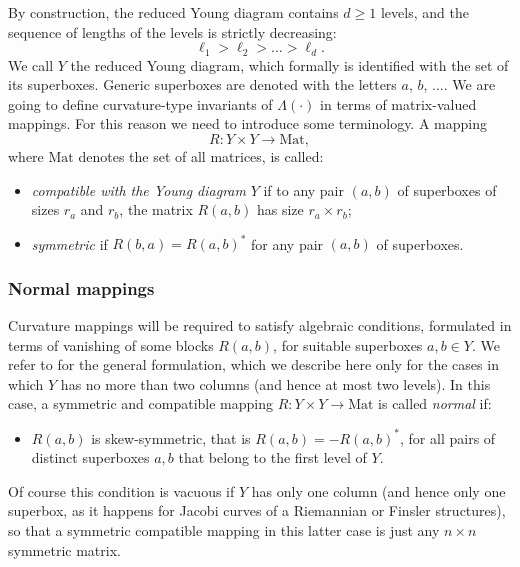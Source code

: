 \documentclass[11pt,a4paper]{article}
\theoremstyle{plain}
\theoremstyle{definition}
\theoremstyle{remark}
\numberwithin{equation}{section}
\begin{document}
By construction, the reduced Young diagram contains $d\geq 1$ levels, and the sequence of lengths of the levels is strictly decreasing:
\begin{equation}
\ell_1 > \ell_2 > \dots > \ell_d.
\end{equation}
We call $Y$ the reduced Young diagram, which formally is identified with the set of its superboxes. Generic superboxes are denoted with the letters $a$, $b$, $\dots$. We are going to define curvature-type invariants of $\Lambda(\cdot)$ in terms of matrix-valued mappings. For this reason we need to introduce some terminology. A mapping
\begin{equation}
R: Y \times Y \to \mathrm{Mat},
\end{equation}
where $\mathrm{Mat}$ denotes the set of all matrices, is called:
\begin{itemize}
\item \emph{compatible with the Young diagram} $Y$ if to any pair $(a,b)$ of superboxes of sizes $r_{a}$ and $r_{b}$, the matrix $R(a,b)$ has size $r_a\times r_b$;
\item \emph{symmetric} if $R(b,a) = R(a,b)^*$ for any pair $(a,b)$ of superboxes.
\end{itemize}

\subsubsection{Normal mappings}

Curvature mappings will be required to satisfy algebraic conditions, formulated in terms of vanishing of some blocks $R(a,b)$, for suitable superboxes $a,b\in Y$. We refer to \cite[Def.\@ 1, Def.\@ 2]{ZeLi} for the general formulation, which we describe here only for the cases in which $Y$ has no more than two columns (and hence at most two levels). In this case, a symmetric and compatible mapping $R: Y\times Y \to \mathrm{Mat}$ is called \emph{normal} if:
\begin{itemize}
\item $R(a,b)$ is skew-symmetric, that is $R(a,b) = -R(a,b)^*$, for all pairs of distinct superboxes $a,b$ that belong to the first level of $Y$.
\end{itemize}
Of course this condition is vacuous if $Y$ has only one column (and hence only one superbox, as it happens for Jacobi curves of a Riemannian or Finsler structures), so that a symmetric compatible mapping in this latter case is just any $n\times n$ symmetric matrix.
\end{document}
